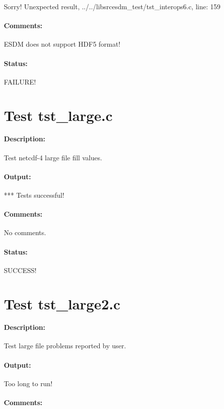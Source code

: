 Sorry! Unexpected result, ../../libsrcesdm\_test/tst\_interops6.c, line: 159

\paragraph{Comments:} ESDM does not support HDF5 format!

\paragraph{Status:} FAILURE!

\section{Test tst\_large.c}

\paragraph{Description:} Test netcdf-4 large file fill values.

\paragraph{Output:} *** Tests successful!

\paragraph{Comments:} No comments.

\paragraph{Status:} SUCCESS!

\section{Test tst\_large2.c}

\paragraph{Description:} Test large file problems reported by user.

\paragraph{Output:} Too long to run!

\paragraph{Comments:}

